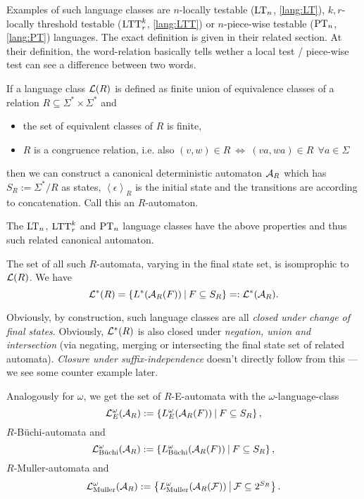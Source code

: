 Examples of such language classes are $n$-locally testable ($\textup{\textrm{LT}}_n$, \cref{lang:LT}), $k,r$-locally threshold testable ($\textup{\textrm{LTT}}_r^k$, \cref{lang:LTT}) or $n$-piece-wise testable ($\textup{\textrm{PT}}_n$, \cref{lang:PT}) languages. The exact definition is given in their related section. At their definition, the word-relation basically tells wether a local test / piece-wise test can see a difference between two words.

If a language class $\mathcal{L}(R)$ is defined as finite union of equivalence classes of a relation $R \subseteq \Sigma^* \times \Sigma^*$ and
\begin{itemize}
\item the set of equivalent classes of $R$ is finite,
\item $R$ is a congruence relation, i.e. also $(v,w) \in R \ \Leftrightarrow \ (va,wa) \in R \ \ \forall a \in \Sigma$
\end{itemize}
then we can construct a canonical deterministic automaton $\mathcal{A}_R$ which has $S_R := \Sigma^* / R$ as states, $\left<\epsilon\right>_R$ is the initial state and the transitions are according to concatenation. Call this an $R$-automaton.

The $\textup{\textrm{LT}}_n$, $\textup{\textrm{LTT}}^k_r$ and $\textup{\textrm{PT}}_n$ language classes have the above properties and thus such related canonical automaton.

The set of all such $R$-automata, varying in the final state set, is isomprophic to $\mathcal{L}(R)$. We have
\[ \Lang^*(R) = \Set{L^*(\A_R(F))}{F \subseteq S_R} =: \Lang^*(\A_R) . \]

Obviously, by construction, such language classes are all \emph{closed under change of final states}. Obviously, $\mathcal{L}^*(R)$ is also closed under \emph{negation, union and intersection} (via negating, merging or intersecting the final state set of related automata). \emph{Closure under suffix-independence} doesn't directly follow from this --- we see some counter example later.

\begin{mydef}
Analogously for $\omega$, we get the set of $R$-E-automata with the $\omega$-language-class
\[ \Lang^\omega_E(\A_R) := \Set{L^\omega_E(\A_R(F))}{F \subseteq S_R} , \]
$R$-Büchi-automata and
\[ \Lang^\omega_{\text{Büchi}} (\A_R) := \Set{L^\omega_\text{Büchi}(\A_R(F))}{F \subseteq S_R} , \]
$R$-Muller-automata and
\[ \Lang^\omega_{\text{Muller}} (\A_R) := \Set{L^\omega_\text{Muller}(\A_R(\F))}{\F \subseteq 2^{S_R}} . \]
\end{mydef}


